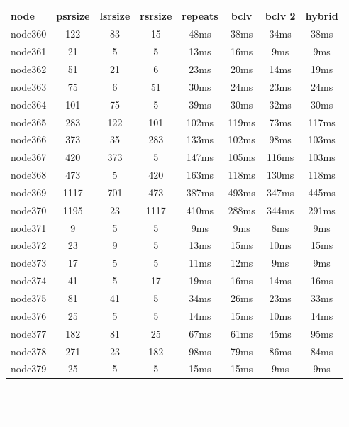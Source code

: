 \begin{tabular}{|l|c|c|c|c|c|c|c|}
\hline node & psrsize & lsrsize & rsrsize   & repeats & bclv & bclv 2 & hybrid\\
    \hline node360 & 122 & 83 & 15 & 48ms & 38ms & 34ms & 38ms\\
    \hline node361 & 21 & 5 & 5 & 13ms & 16ms & 9ms & 9ms\\
    \hline node362 & 51 & 21 & 6 & 23ms & 20ms & 14ms & 19ms\\
    \hline node363 & 75 & 6 & 51 & 30ms & 24ms & 23ms & 24ms\\
    \hline node364 & 101 & 75 & 5 & 39ms & 30ms & 32ms & 30ms\\
    \hline node365 & 283 & 122 & 101 & 102ms & 119ms & 73ms & 117ms\\
    \hline node366 & 373 & 35 & 283 & 133ms & 102ms & 98ms & 103ms\\
    \hline node367 & 420 & 373 & 5 & 147ms & 105ms & 116ms & 103ms\\
    \hline node368 & 473 & 5 & 420 & 163ms & 118ms & 130ms & 118ms\\
    \hline node369 & 1117 & 701 & 473 & 387ms & 493ms & 347ms & 445ms\\
    \hline node370 & 1195 & 23 & 1117 & 410ms & 288ms & 344ms & 291ms\\
    \hline node371 & 9 & 5 & 5 & 9ms & 9ms & 8ms & 9ms\\
    \hline node372 & 23 & 9 & 5 & 13ms & 15ms & 10ms & 15ms\\
    \hline node373 & 17 & 5 & 5 & 11ms & 12ms & 9ms & 9ms\\
    \hline node374 & 41 & 5 & 17 & 19ms & 16ms & 14ms & 16ms\\
    \hline node375 & 81 & 41 & 5 & 34ms & 26ms & 23ms & 33ms\\
    \hline node376 & 25 & 5 & 5 & 14ms & 15ms & 10ms & 14ms\\
    \hline node377 & 182 & 81 & 25 & 67ms & 61ms & 45ms & 95ms\\
    \hline node378 & 271 & 23 & 182 & 98ms & 79ms & 86ms & 84ms\\
    \hline node379 & 25 & 5 & 5 & 15ms & 15ms & 9ms & 9ms\\

\hline
\end{tabular} \

---


